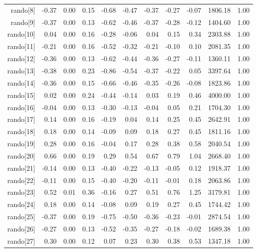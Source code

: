 \begin{table}[ht]
\begin{tabular}{rrrrrrrrrrr}
  rando[8] & -0.37 & 0.00 & 0.15 & -0.68 & -0.47 & -0.37 & -0.27 & -0.07 & 1806.18 & 1.00 \\ 
  rando[9] & -0.37 & 0.00 & 0.13 & -0.62 & -0.46 & -0.37 & -0.28 & -0.12 & 1404.60 & 1.00 \\ 
  rando[10] & 0.04 & 0.00 & 0.16 & -0.28 & -0.06 & 0.04 & 0.15 & 0.34 & 2303.88 & 1.00 \\ 
  rando[11] & -0.21 & 0.00 & 0.16 & -0.52 & -0.32 & -0.21 & -0.10 & 0.10 & 2081.35 & 1.00 \\ 
  rando[12] & -0.36 & 0.00 & 0.13 & -0.62 & -0.44 & -0.36 & -0.27 & -0.11 & 1360.11 & 1.00 \\ 
  rando[13] & -0.38 & 0.00 & 0.23 & -0.86 & -0.54 & -0.37 & -0.22 & 0.05 & 3397.64 & 1.00 \\ 
  rando[14] & -0.36 & 0.00 & 0.15 & -0.66 & -0.46 & -0.35 & -0.26 & -0.08 & 1823.86 & 1.00 \\ 
  rando[15] & 0.02 & 0.00 & 0.24 & -0.44 & -0.14 & 0.03 & 0.19 & 0.46 & 4000.00 & 1.00 \\ 
  rando[16] & -0.04 & 0.00 & 0.13 & -0.30 & -0.13 & -0.04 & 0.05 & 0.21 & 1704.30 & 1.00 \\ 
  rando[17] & 0.14 & 0.00 & 0.16 & -0.19 & 0.04 & 0.14 & 0.25 & 0.45 & 2642.91 & 1.00 \\ 
  rando[18] & 0.18 & 0.00 & 0.14 & -0.09 & 0.09 & 0.18 & 0.27 & 0.45 & 1811.16 & 1.00 \\ 
  rando[19] & 0.28 & 0.00 & 0.16 & -0.04 & 0.17 & 0.28 & 0.38 & 0.58 & 2040.54 & 1.00 \\ 
  rando[20] & 0.66 & 0.00 & 0.19 & 0.29 & 0.54 & 0.67 & 0.79 & 1.04 & 2668.40 & 1.00 \\ 
  rando[21] & -0.14 & 0.00 & 0.13 & -0.40 & -0.22 & -0.13 & -0.05 & 0.12 & 1918.37 & 1.00 \\ 
  rando[22] & -0.11 & 0.00 & 0.15 & -0.40 & -0.20 & -0.11 & -0.01 & 0.18 & 2063.86 & 1.00 \\ 
  rando[23] & 0.52 & 0.01 & 0.36 & -0.16 & 0.27 & 0.51 & 0.76 & 1.25 & 3179.81 & 1.00 \\ 
  rando[24] & 0.18 & 0.00 & 0.14 & -0.08 & 0.09 & 0.19 & 0.27 & 0.45 & 1744.42 & 1.00 \\ 
  rando[25] & -0.37 & 0.00 & 0.19 & -0.75 & -0.50 & -0.36 & -0.23 & -0.01 & 2874.54 & 1.00 \\ 
  rando[26] & -0.27 & 0.00 & 0.13 & -0.52 & -0.35 & -0.27 & -0.18 & -0.02 & 1689.38 & 1.00 \\ 
  rando[27] & 0.30 & 0.00 & 0.12 & 0.07 & 0.23 & 0.30 & 0.38 & 0.53 & 1347.18 & 1.00 \\ 

\end{tabular}
\end{table}
